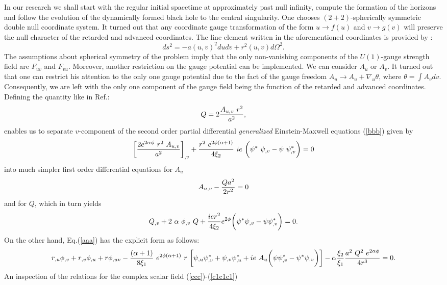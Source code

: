 \documentclass[aps,showpacs,nofootinbib,floatfix]{revtex4}
\newcommand{\be}{\begin{equation}}
\newcommand{\ee}{\end{equation}}
\newcommand{\na}{\nabla}
\newcommand{\zpsi}{\psi^{\ast}}
\begin{document}
In our research we shall start with the regular initial spacetime at approximately past null infinity, 
compute the formation of the horizons and follow the evolution of the dynamically formed black hole to the central singularity.
One chooses $(2+2)$-spherically symmetric double null coordinate system. It turned out that any coordinate
gauge transformation of the form $u \rightarrow f(u)$ and $v \rightarrow g(v)$ will preserve the null character of the
retarded and advanced coordinates. The line element written in the aforementioned coordinates is provided by
\cite{chr93}:
\be
ds^2 = - a(u, v)^2 du dv + r^2(u, v) d \Omega^2.
\label{m}
\ee
The assumptions about spherical symmetry of the problem imply that the only non-vanishing components of
the $U(1)$-gauge strength field are $F_{uv}$ and $F_{vu}$.
Moreover, another restriction on the gauge potential can be implemented. We can consider $A_{u}$ or $A_{v}$.
It turned out \cite{bor11} that one can restrict his attention to the only one gauge potential due to the fact
of the gauge freedom $A_{u} \rightarrow A_{u} + \na_{u} \theta$, where $\theta = \int A_{v}dv$. Consequently,
we are left with the only one component of the gauge field being the function of the retarded and advanced coordinates.\\
Defining the quantity like in Ref.\cite{ore03}:
\be
Q = 2 {A_{u, v}~r^2 \over a^2},
\label{charge}
\ee 
enables us to separate $v$-component of the 
second order partial differential {\it generalized} Einstein-Maxwell equations (\ref{bbb}) given by
\be
\bigg[ {2 e^{2 \alpha \phi}~r^2~A_{u,v} \over a^2} \bigg]_{,v} +
{r^2~e^{2 \phi (\alpha + 1)} \over 4 \xi_2 }~ie~  \bigg(
\zpsi~\psi_{,v} - \psi~\zpsi_{,v} \bigg) = 0
\ee
into much simpler first order differential equations for $A_{u}$
\be
A_{u, v} - {Q a^{2} \over 2 r^{2}} = 0
\label{p}
\ee
and for $Q$, which in turn yields
\be
Q_{,v} + 2~ \alpha~ \phi_{,v}~ Q + {i e r^2 \over 4 \xi_2} e^{2 \phi}
\bigg( \zpsi \psi_{,v} - \psi \zpsi_{,v} \bigg) = 0. 
\label{l}
\ee
On the other hand, Eq.(\ref{aaa}) has the explicit form as follows:
\be
r_{,u} \phi_{,v} + r_{,v} \phi_{,u} + r \phi_{,uv} -
{(\alpha + 1) \over 8 \xi_1}~e^{2 \phi (\alpha + 1)}~ r~ \bigg[
\psi_{,u} \zpsi_{,v} + \psi_{,v} \zpsi_{,u} + i e~ A_{u}
\bigg( \psi \zpsi_{,v} - \zpsi \psi_{,v} \bigg ) \bigg ]
- \alpha {\xi_2 \over \xi_1}
{a^2~Q^2~ e^{ 2 \alpha \phi}
\over 4 r^3} = 0.
\ee
An inspection of the relations for the complex scalar field (\ref{ccc})-(\ref{c1c1c1})
\end{document}

